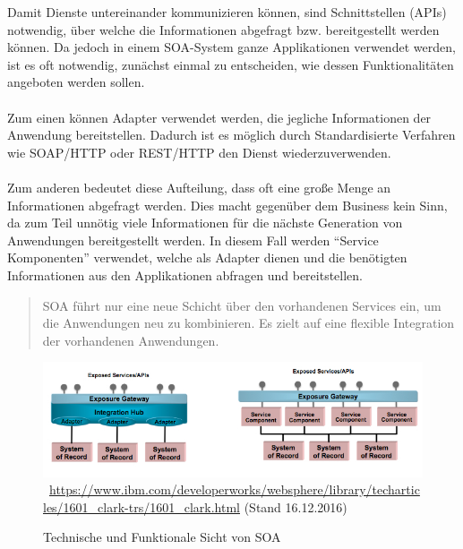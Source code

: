 Damit Dienste untereinander kommunizieren können, sind Schnittstellen (APIs) notwendig, über welche die Informationen abgefragt bzw. bereitgestellt werden können. Da jedoch in einem SOA-System ganze Applikationen verwendet werden, ist es oft notwendig, zunächst einmal zu entscheiden, wie dessen Funktionalitäten angeboten werden sollen.
\\\\
Zum einen können Adapter verwendet werden, die jegliche Informationen der Anwendung bereitstellen. Dadurch ist es möglich durch Standardisierte Verfahren wie SOAP/HTTP oder REST/HTTP den Dienst wiederzuverwenden.
\\\\
Zum anderen bedeutet diese Aufteilung, dass oft eine große Menge an Informationen abgefragt werden. Dies macht gegenüber dem Business kein Sinn, da zum Teil unnötig viele Informationen für die nächste Generation von Anwendungen bereitgestellt werden. In diesem Fall werden "`Service Komponenten"' verwendet, welche als Adapter dienen und die benötigten Informationen aus den Applikationen abfragen und bereitstellen.
\begin{quotation}
	\frqq SOA führt nur eine neue Schicht über den vorhandenen Services ein, um die Anwendungen neu zu kombinieren. Es zielt auf eine flexible Integration der vorhandenen Anwendungen.\flqq\ \cite[S. 92]{EWolff2016:Microservices}
\end{quotation}

\begin{figure}[htb]
    \centering 
    \includegraphics[width=\linewidth]{content/images/figure2}\
    \quelle\url{https://www.ibm.com/developerworks/websphere/library/techarticles/1601_clark-trs/1601_clark.html} (Stand 16.12.2016)
    \caption{Technische und Funktionale Sicht von SOA}
    \label{fig:TechnicalAndFunctionalViewsOfSOA} 
\end{figure}

